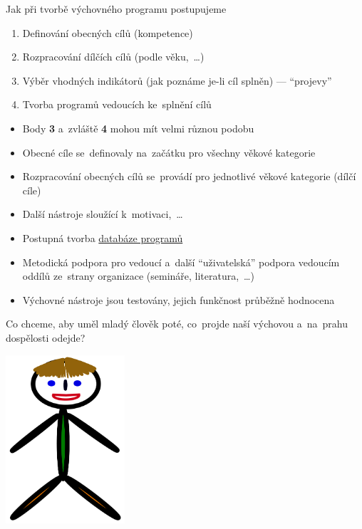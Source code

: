 \documentclass[compress, xelatex, 11pt, xcolor=dvipsnames, print, aspectratio=169,
	hyperref={
		bookmarks=true,
		unicode=true,
		colorlinks=true,
		pdftitle={Skautska vychovna metoda},
		plainpages=false,
		pdfauthor={Vojtech Zeisek},
		pdfsubject={Skautska vychovna metoda a jeji vyvoj za posledni stoleti a desetileti},
		pdfcreator={XeLaTeX},
		pdfkeywords={Junak, Pedagogika, Skaut, Skauting, Vychovna metoda},
		linkcolor=Red, %
		anchorcolor=ForestGreen, %
		citecolor=ForestGreen, %
		filecolor=ForestGreen, %
		menucolor=ForestGreen, %
		urlcolor=Sepia, %
		pdftex},
	url={hyphens, lowtilde} %
	]{beamer}
\begin{document}
\begin{frame}{Jak při tvorbě výchovného programu postupujeme}
	\begin{enumerate}
		\item Definování obecných cílů (kompetence)
		\item Rozpracování dílčích cílů (podle věku,~\ldots)
		\item Výběr vhodných indikátorů (jak poznáme je-li cíl splněn) --- \enquote{projevy}
		\item Tvorba programů vedoucích ke~splnění cílů
	\end{enumerate}
	\begin{itemize}
		\item Body \textbf{3} a~zvláště \textbf{4} mohou mít velmi různou podobu
		\item Obecné cíle se~definovaly na~začátku pro všechny věkové kategorie
		\item Rozpracování obecných cílů se~provádí pro jednotlivé věkové kategorie (dílčí cíle)
		\item Další nástroje sloužící k~motivaci,~\ldots
		\item Postupná tvorba \href{https://chystamprogram.skaut.cz/}{databáze programů}
		\item Metodická podpora pro vedoucí a~další \enquote{uživatelská} podpora vedoucím oddílů ze~strany organizace (semináře, literatura,~\ldots)
		\item Výchovné nástroje jsou testovány, jejich funkčnost průběžně hodnocena
	\end{itemize}
\end{frame}

\begin{frame}{Co chceme, aby uměl mladý člověk poté, co~projde naší výchovou a~na~prahu dospělosti odejde?}
	\begin{center}
		\includegraphics[height=6.25cm]{pepicek.png}
	\end{center}
\end{frame}
\end{document}
